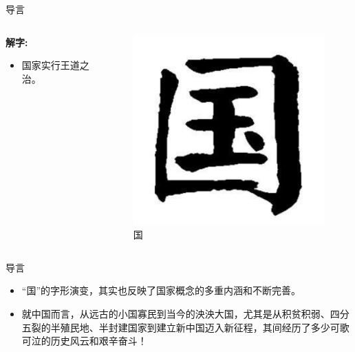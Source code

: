 \documentclass{beamer}
\begin{document}
	\begin{frame}{导言}
		\begin{columns}
    		\begin{column}{0.5\textwidth} %
      		\textbf{解字:}
      		\begin{itemize}
        		\item 国家实行王道之治。
      		\end{itemize}
    		\end{column}
    		\begin{column}{0.5\textwidth} %
      		\begin{figure}
        		\includegraphics[width=0.7\linewidth]{fig/guojian.png} %
        		\caption{国}
      		\end{figure}
    		\end{column}
  		\end{columns}
	\end{frame}
	\begin{frame}{导言}
		\begin{itemize}
			\item “国”的字形演变，其实也反映了国家概念的多重内涵和不断完善。
			\item 就中国而言，从远古的小国寡民到当今的泱泱大国，尤其是从积贫积弱、四分五裂的半殖民地、半封建国家到建立新中国迈入新征程，其间经历了多少可歌可泣的历史风云和艰辛奋斗！
		\end{itemize}
	\end{frame}
	
\end{document}
